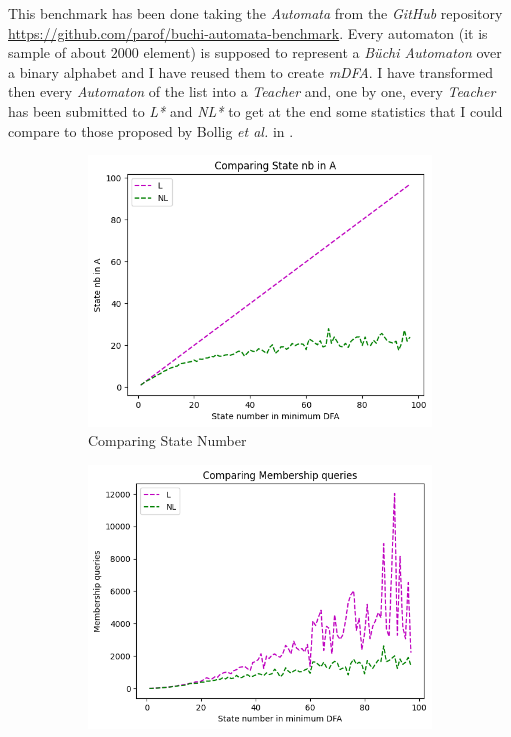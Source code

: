 This benchmark has been done taking the \textit{Automata} from the \textit{GitHub} repository \url{https://github.com/parof/buchi-automata-benchmark}. Every automaton (it is sample of about $2000$ element) is supposed to represent a \textit{Büchi Automaton} over a binary alphabet and I have reused them to create \textit{mDFA}. I have transformed then every \textit{Automaton} of the list into a \textit{Teacher} and, one by one, every \textit{Teacher} has been submitted to \textit{L*} and \textit{NL*} to get at the end some statistics that I could compare to those proposed by Bollig \textit{et al.} in \cite{NLPaper}.

\begin{figure}[!htb]
  \centering
  \begin{subfigure}[b]{0.3\textwidth}
    \includegraphics[width=\textwidth]{../statistics/plots/BenchMark/State nb in A.png}
    \caption{Comparing State Number}
    \label{fig:StateBenchMarkCompare}
  \end{subfigure}
  \begin{subfigure}[b]{0.3\textwidth}
    \includegraphics[width=\textwidth]{../statistics/plots/BenchMark/Membership queries.png}

\end{subfigure}
\end{figure}

